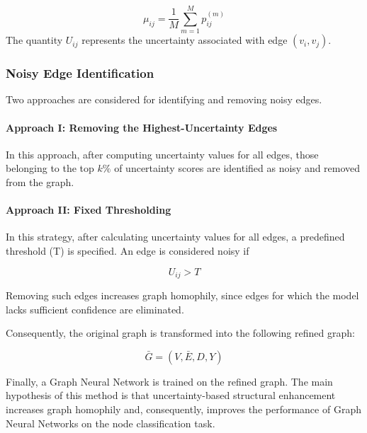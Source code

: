 \documentclass{article}
\begin{document}
\begin{equation}
\mu_{ij}=\frac{1}{M}\sum_{m=1}^{M}p_{ij}^{(m)}
\label{eq:mean_probability}
\end{equation}
The quantity \( U_{ij} \) represents the uncertainty associated with edge \((v_i, v_j)\).

\subsubsection{Noisy Edge Identification}

Two approaches are considered for identifying and removing noisy edges.

\paragraph{Approach I: Removing the Highest-Uncertainty Edges}

In this approach, after computing uncertainty values for all edges, those belonging to the top \( k \% \) of uncertainty scores are identified as noisy and removed from the graph.

\paragraph{Approach II: Fixed Thresholding}

In this strategy, after calculating uncertainty values for all edges, a predefined threshold (T) is specified. An edge is considered noisy if

\begin{equation}
U_{ij} > T
\label{eq:uncertainty_threshold}
\end{equation}

Removing such edges increases graph homophily, since edges for which the model lacks sufficient confidence are eliminated.

Consequently, the original graph is transformed into the following refined graph:

\begin{equation}
\bar{G} = (V, \bar{E}, D, Y)
\label{eq:refined_graph_uncertainty}
\end{equation}

Finally, a Graph Neural Network is trained on the refined graph. The main hypothesis of this method is that uncertainty-based structural enhancement increases graph homophily and, consequently, improves the performance of Graph Neural Networks on the node classification task.
\end{document}
